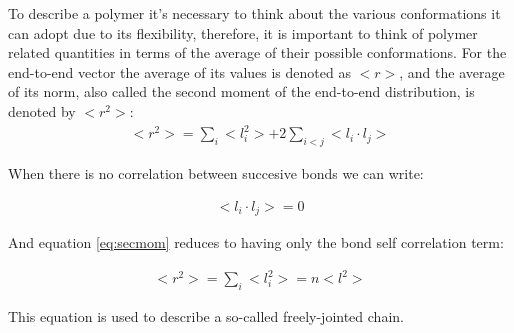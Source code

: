 To  describe a  polymer  it's  necessary to  think  about the  various
conformations it can adopt  due to its flexibility, therefore, it
is important  to think of polymer  related quantities in  terms of the
average of their possible conformations. For the end-to-end vector the
average of  its values  is denoted  as $<r>$, and  the average  of its
norm, also called the second moment of the end-to-end distribution, is
denoted by $<r^2>$:
\begin{gather}
\label{eq:secmom}  
<r^2>=\sum_{i}<l_{i}^2> + 2\sum_{i<j}<l_{i} \cdot l_{j}>
\end{gather}  

When there is no correlation between succesive bonds we can write:

\begin{gather}
\label{eq:nocorr}
<l_{i} \cdot l_{j}> = 0
\end{gather}

And equation \ref{eq:secmom} reduces to having only the bond self
correlation term:

\begin{gather}
<r^2> = \sum_{i}<l_{i}^2> = n<l^2>
\end{gather}  

This equation is used to describe a so-called freely-jointed chain.

